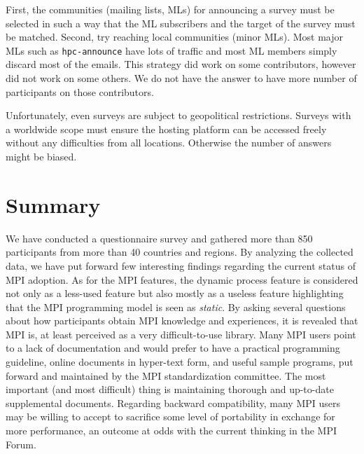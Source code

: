 \documentclass[preprint,5p,times]{elsarticle}
\begin{document}
{{\begin{description}[leftmargin=0cm]
\item[Reaching Target Community]
First, the communities (mailing lists, MLs) for announcing a survey
must be selected
in such a way that the ML subscribers and the target of the survey
must be matched. Second, try reaching local communities (minor
MLs). Most major MLs such as {\tt hpc-announce} have lots 
of traffic and most ML members simply discard most of the emails.
%
This strategy did work on some contributors, however did not work
on some others. We do not have the answer to have more number
of participants on those contributors.

\item[Online Forms]
Unfortunately, even surveys are subject to geopolitical restrictions.
Surveys with a worldwide scope must ensure the hosting platform
can be accessed freely
without any difficulties from all locations. Otherwise the number of
answers might be biased.

\end{description}
}

\section{Summary}

We have conducted a questionnaire survey and gathered more than 850
participants from more than 40 countries and regions. By analyzing the collected
data, we have put forward few interesting findings regarding the current status
of MPI adoption. As for the MPI features, the dynamic process feature is
considered not only as a less-used feature but also mostly as a useless feature
highlighting that the MPI programming model is seen as {\em static}. By asking
several questions about how participants obtain MPI knowledge and experiences, it is
revealed that MPI is, at least perceived as a very difficult-to-use library.
 Many MPI users point to a lack of
documentation and would prefer to have a practical programming guideline, online
documents in hyper-text form, and useful sample programs, put forward and
maintained by the MPI standardization committee. The most important (and most
difficult) thing is maintaining thorough and up-to-date supplemental documents.
Regarding backward compatibility, many MPI users may be willing to accept to
sacrifice some level of portability in exchange for more performance, an outcome
at odds with the current thinking in the MPI Forum.

}
\end{document}
